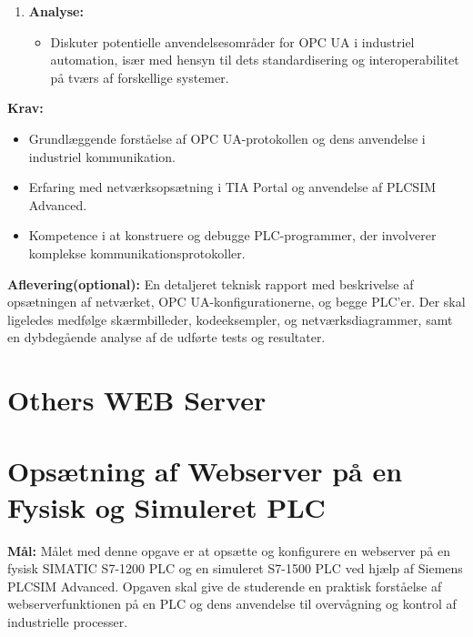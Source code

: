 \begin{enumerate}
	\item \textbf{Analyse:}
	\begin{itemize}
		\item Diskuter potentielle anvendelsesområder for OPC UA i industriel automation, især med hensyn til dets standardisering og interoperabilitet på tværs af forskellige systemer.
	\end{itemize}
\end{enumerate}

\textbf{Krav:}
\begin{itemize}
	\item Grundlæggende forståelse af OPC UA-protokollen og dens anvendelse i industriel kommunikation.
	\item Erfaring med netværksopsætning i TIA Portal og anvendelse af PLCSIM Advanced.
	\item Kompetence i at konstruere og debugge PLC-programmer, der involverer komplekse kommunikationsprotokoller.
\end{itemize}

\noindent\textbf{Aflevering(optional):} En detaljeret teknisk rapport med beskrivelse af opsætningen af netværket, OPC UA-konfigurationerne, og begge PLC'er. Der skal ligeledes medfølge skærmbilleder, kodeeksempler, og netværksdiagrammer, samt en dybdegående analyse af de udførte tests og resultater.

\section{Others WEB Server}
\label{subsec:webserver_s7_1500}

\section{Opsætning af Webserver på en Fysisk og Simuleret PLC}
\label{subsec:webserver_simulated_physical_plc}

\textbf{Mål:} Målet med denne opgave er at opsætte og konfigurere en webserver på en fysisk SIMATIC S7-1200 PLC og en simuleret S7-1500 PLC ved hjælp af Siemens PLCSIM Advanced. Opgaven skal give de studerende en praktisk forståelse af webserverfunktionen på en PLC og dens anvendelse til overvågning og kontrol af industrielle processer.

